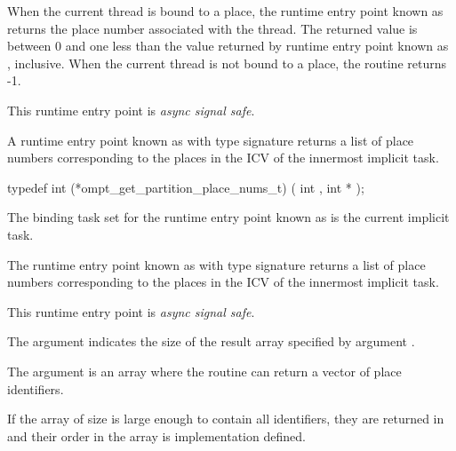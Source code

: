 When the current thread is bound to a place,
the runtime entry point known as 
returns the place number associated with the thread.
The returned value is between 0 and one less than the value returned
by runtime entry point known as , inclusive.
When the current thread is not bound to a place, the routine returns -1.

This runtime entry point is \emph{async signal safe}.


\label{sec:ompt_get_partition_place_nums_t}
\label{sec:ompt_get_partition_place_nums}

\summary

A runtime entry point known as
 with type signature
returns a list of place numbers corresponding to the places in the 
ICV of the innermost implicit task.

\format

\begin{ccppspecific}
\begin{omptInquiry}
typedef int (*ompt_get_partition_place_nums_t) (
  int ,
  int *
);
\end{omptInquiry}
\end{ccppspecific}

\binding

The binding task set for
the runtime entry point known as 
is the current implicit task.

\descr

The runtime entry point known as
 with type signature
 returns a list of place
numbers corresponding to the places in the 
ICV of the innermost implicit task.

This runtime entry point is \emph{async signal safe}.

\argdesc

The argument  indicates the size of the result
array specified by argument .

The argument  is an array where the routine can return
a vector of place identifiers.

\effect

If the array  of size  is
large enough to contain all identifiers, they are returned in
 and their order in the array is implementation
defined.

